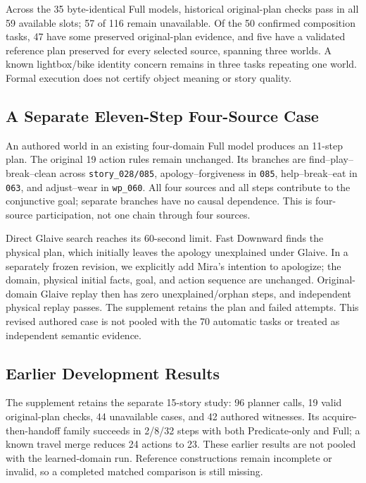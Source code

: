Across the 35 byte-identical Full models, historical original-plan checks pass in all 59 available slots; 57 of 116 remain unavailable. Of the 50 confirmed composition tasks, 47 have some preserved original-plan evidence, and five have a validated reference plan preserved for every selected source, spanning three worlds. A known lightbox/bike identity concern remains in three tasks repeating one world. Formal execution does not certify object meaning or story quality.

\subsection{A Separate Eleven-Step Four-Source Case}
An authored world in an existing four-domain Full model produces an 11-step plan. The original 19 action rules remain unchanged. Its branches are find--play--break--clean across \texttt{story\_028/085}, apology--forgiveness in \texttt{085}, help--break--eat in \texttt{063}, and adjust--wear in \texttt{wp\_060}. All four sources and all steps contribute to the conjunctive goal; separate branches have no causal dependence. This is four-source participation, not one chain through four sources.

Direct Glaive search reaches its 60-second limit. Fast Downward finds the physical plan, which initially leaves the apology unexplained under Glaive. In a separately frozen revision, we explicitly add Mira's intention to apologize; the domain, physical initial facts, goal, and action sequence are unchanged. Original-domain Glaive replay then has zero unexplained/orphan steps, and independent physical replay passes. The supplement retains the plan and failed attempts. This revised authored case is not pooled with the 70 automatic tasks or treated as independent semantic evidence.

\subsection{Earlier Development Results}
The supplement retains the separate 15-story study: 96 planner calls, 19 valid original-plan checks, 44 unavailable cases, and 42 authored witnesses. Its acquire-then-handoff family succeeds in 2/8/32 steps with both Predicate-only and Full; a known travel merge reduces 24 actions to 23. These earlier results are not pooled with the learned-domain run. Reference constructions remain incomplete or invalid, so a completed matched comparison is still missing.

